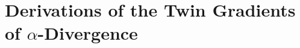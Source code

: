 \documentclass[letterpaper]{article} %
\newcommand{\betav}[0]{\ensuremath{\boldsymbol{\beta}} }
\begin{document}




\section{Derivations of the Twin Gradients of $\alpha$-Divergence}
\label{sec:derive_twin_grad}
\end{document}
